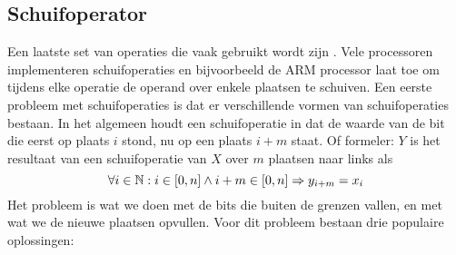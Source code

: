 \subsection{Schuifoperator}
Een laatste set van operaties die vaak gebruikt wordt zijn . Vele processoren implementeren schuifoperaties en bijvoorbeeld de ARM processor laat toe om tijdens elke operatie de operand over enkele plaatsen te schuiven. Een eerste probleem met schuifoperaties is dat er verschillende vormen van schuifoperaties bestaan. In het algemeen houdt een schuifoperatie in dat de waarde van de bit die eerst op plaats $i$ stond, nu op een plaats $i+m$ staat. Of formeler: $Y$ is het resultaat van een schuifoperatie van $X$ over $m$ plaatsen naar links als
\begin{equation}
\forall i\in\mathbb{N}:i\in\left[0,n\right]\wedge i+m\in\left[0,n\right]\Rightarrow y_{i+m}=x_i
\end{equation}
Het probleem is wat we doen met de bits die buiten de grenzen vallen, en met wat we de nieuwe plaatsen opvullen. Voor dit probleem bestaan drie populaire oplossingen:

